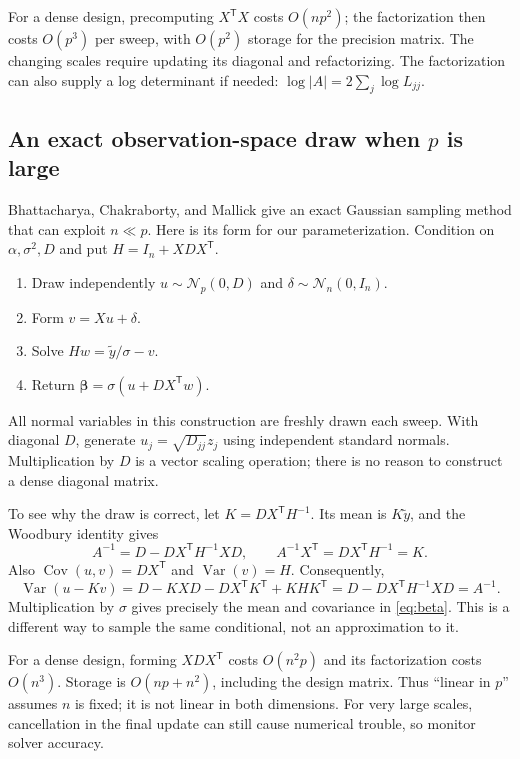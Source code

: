 \documentclass[11pt,letterpaper]{article}
\numberwithin{equation}{section}
\newcommand{\Var}{\operatorname{Var}}
\newcommand{\Cov}{\operatorname{Cov}}
\newcommand{\Normal}{\mathcal{N}}
\newcommand{\bbeta}{\bm{\beta}}
\newcommand{\trans}{^{\mathsf T}}
\begin{document}
For a dense design, precomputing \(X\trans X\) costs \(O(np^2)\); the
factorization then costs \(O(p^3)\) per sweep, with \(O(p^2)\) storage for
the precision matrix. The changing scales require updating its diagonal and
refactorizing. The factorization can also supply a log determinant if needed:
\(\log|A|=2\sum_j\log L_{jj}\).

\subsection{An exact observation-space draw when \texorpdfstring{\(p\)}{p} is large}

Bhattacharya, Chakraborty, and Mallick \cite{bhattacharya2016} give an exact
Gaussian sampling method that can exploit \(n\ll p\). Here is its form for
our parameterization. Condition on \(\alpha,\sigma^2,D\) and put
\(H=I_n+XDX\trans\).
\begin{enumerate}
\item Draw independently \(u\sim\Normal_p(0,D)\) and
      \(\delta\sim\Normal_n(0,I_n)\).
\item Form \(v=Xu+\delta\).
\item Solve \(Hw=\widetilde y/\sigma-v\).
\item Return \(\bbeta=\sigma(u+DX\trans w)\).
\end{enumerate}
All normal variables in this construction are freshly drawn each sweep.
With diagonal \(D\), generate \(u_j=\sqrt{D_{jj}}z_j\) using independent
standard normals. Multiplication by \(D\) is a vector scaling operation;
there is no reason to construct a dense diagonal matrix.

To see why the draw is correct, let \(K=DX\trans H^{-1}\). Its mean is
\(K\widetilde y\), and the Woodbury identity gives
\begin{equation}\label{eq:woodbury}
 A^{-1}=D-DX\trans H^{-1}XD,
 \qquad A^{-1}X\trans=DX\trans H^{-1}=K.
\end{equation}
Also \(\Cov(u,v)=DX\trans\) and \(\Var(v)=H\). Consequently,
\[
 \Var(u-Kv)=D-KXD-DX\trans K\trans+KHK\trans
           =D-DX\trans H^{-1}XD=A^{-1}.
\]
Multiplication by \(\sigma\) gives precisely the mean and covariance in
\eqref{eq:beta}. This is a different way to sample the same conditional,
not an approximation to it.

For a dense design, forming \(XDX\trans\) costs \(O(n^2p)\) and its
factorization costs \(O(n^3)\). Storage is \(O(np+n^2)\), including the
design matrix. Thus ``linear in \(p\)'' assumes \(n\) is fixed; it is not
linear in both dimensions. For very large scales, cancellation in the final
update can still cause numerical trouble, so monitor solver accuracy.
\end{document}
